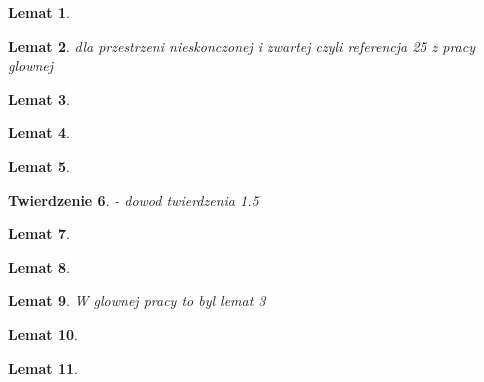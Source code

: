 \documentclass[licencjacka]{pwr_wmat_praca_dyplomowa}
\theoremstyle{plain}
\newtheorem{theorem}{Twierdzenie}
\numberwithin{theorem}{chapter}
\newtheorem{lemma}[theorem]{Lemat}
\theoremstyle{definition}
\numberwithin{theorem}{chapter}
\begin{document}
\begin{lemma}\label{rownosc_entropii_gdy_wlokna_monotoniczne}
\end{lemma}

\begin{lemma}
\label{warunki_dostateczne_chaotycznosci_devaneya}
dla przestrzeni nieskonczonej i zwartej czyli referencja 25 z pracy glownej
\end{lemma}

\begin{lemma} \label{F_jest_niepustym_domknietym_podzbiorem_trojkatnych}
\end{lemma}

\begin{lemma} \label{trojkatne_tworza_przestrzen_metryczna_zupelna}
\end{lemma}

\begin{lemma} \label{przekroj_rezydualnych_jest_rezydualny}
\end{lemma}

\begin{theorem} \label{tranzytywne_rezydualne_w_F}
\cite{alseda1999entropy} - dowod twierdzenia 1.5
\end{theorem}

\begin{lemma} \label{Fso_sa_otwartymi_podzbiorami_F}
\end{lemma}

\begin{lemma}
\label{w_otoczeniu_niezmienniczego_jest_otwarty_zawarty_w_iteracjach}
\end{lemma}

\begin{lemma}
\label{istnieje_orbita_okresowa_krojaca_sie_z_rodzina_otwartych}
W glownej pracy to byl lemat 3
\end{lemma}

\begin{lemma}
\label{wszystkie_wloknowe_na_implikuje_punkt_okresowy}
\end{lemma}

\begin{lemma}
\label{lemat_4_glownego_artykulu}
\end{lemma}
\end{document}

